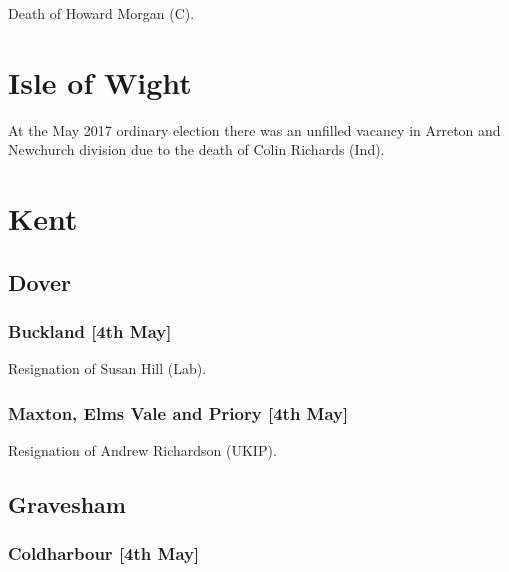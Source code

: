 \documentclass[a4paper,openany]{book}
\begin{document}
\begin{resultsiii}

Death of Howard Morgan (C).

\section{Isle of Wight}

At the May 2017 ordinary election there was an unfilled vacancy in Arreton and Newchurch division due to the death of Colin Richards (Ind).

\section{Kent}

\subsection*{Dover}

\subsubsection*{Buckland \hspace*{\fill}\nolinebreak[1]%
\enspace\hspace*{\fill}
[4th May]}


Resignation of Susan Hill (Lab).

\subsubsection*{Maxton, Elms Vale and Priory \hspace*{\fill}\nolinebreak[1]%
\enspace\hspace*{\fill}
[4th May]}


Resignation of Andrew Richardson (UKIP).

\subsection*{Gravesham}

\subsubsection*{Coldharbour \hspace*{\fill}\nolinebreak[1]%
\enspace\hspace*{\fill}
[4th May]}


\end{resultsiii}
\end{document}
